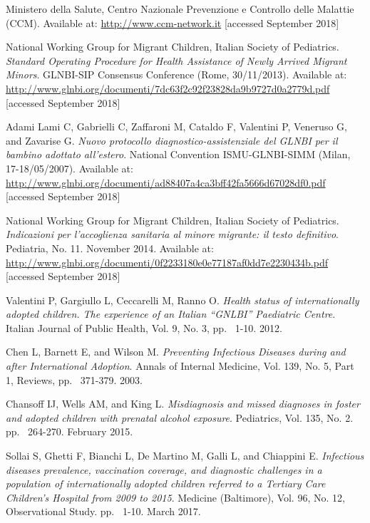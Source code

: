 \begin{thebibliography}{50}
  Ministero della Salute, Centro Nazionale Prevenzione e Controllo delle Malattie (CCM).  
  Available at: \url{http://www.ccm-network.it} [accessed September 2018]
  
  National Working Group for Migrant Children, Italian Society of Pediatrics.
  \textit{Standard Operating Procedure for Health Assistance of Newly Arrived Migrant Minors}.
  GLNBI-SIP Consensus Conference (Rome, 30/11/2013).
  Available at: \url{http://www.glnbi.org/documenti/7dc63f2c92f23828da9b9727d0a2779d.pdf} [accessed September 2018]
  
  Adami Lami C, Gabrielli C, Zaffaroni M, Cataldo F, Valentini P, Veneruso G, and Zavarise G.
  \textit{Nuovo protocollo diagnostico-assistenziale del GLNBI per il bambino adottato all'estero}.
   National Convention ISMU-GLNBI-SIMM (Milan, 17-18/05/2007).
  Available at: \url{http://www.glnbi.org/documenti/ad88407a4ca3bff42fa5666d67028df0.pdf} [accessed September 2018]
  
  National Working Group for Migrant Children, Italian Society of Pediatrics.
  \textit{Indicazioni per l’accoglienza sanitaria al minore migrante: il testo definitivo}.
  Pediatria, No. 11.
  November 2014.
  Available at: \url{http://www.glnbi.org/documenti/0f2233180e0e77187af0dd7e2230434b.pdf} [accessed September 2018]
  
  Valentini P, Gargiullo L, Ceccarelli M, Ranno O.
  \textit{Health status of internationally adopted children. The experience of an Italian “GNLBI” Paediatric Centre}.
  Italian Journal of Public Health, Vol. 9, No. 3,
  pp. ~1-10.
  2012.
  
  Chen L, Barnett E, and Wilson M.
  \textit{Preventing Infectious Diseases during and after International Adoption}.
  Annals of Internal Medicine, Vol. 139, No. 5, Part 1,
  Reviews,
  pp. ~371-379.
  2003.
  
  Chansoff IJ, Wells AM, and King L.
  \textit{Misdiagnosis and missed diagnoses in foster and adopted children with prenatal alcohol exposure}.
  Pediatrics, Vol. 135, No. 2.
  pp. ~264-270.
  February 2015.
  
  Sollai S, Ghetti F, Bianchi L, De Martino M, Galli L, and Chiappini E.
  \textit{Infectious diseases prevalence, vaccination coverage, and diagnostic challenges in a population of internationally adopted children referred to a Tertiary Care Children’s Hospital from 2009 to 2015}.
  Medicine (Baltimore), Vol. 96, No. 12,
  Observational Study.
  pp. ~1-10.
  March 2017.
  

\end{thebibliography}
